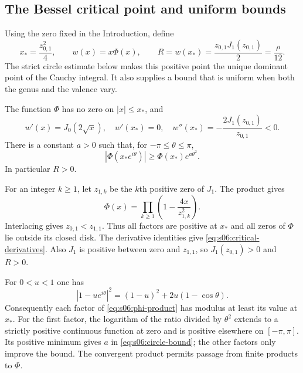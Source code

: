 \subsection{The Bessel critical point and uniform bounds}
\label{subsec:s06:02}

Using the zero fixed in the Introduction, define
\begin{equation}\label{eq:s06:critical-data}
 x_* =\frac{z_{0,1}^2}{4},\qquad
 w(x)=x\Phi(x),\qquad
 R=w(x_*)=\frac{z_{0,1}J_1(z_{0,1})}{2}=\frac{\rho}{12}.
\end{equation}
The strict circle estimate below makes this positive point the
unique dominant point of the Cauchy integral. It also supplies a
bound that is uniform when both the genus and the valence vary.

\begin{lmm}\label{lmm:s06:critical-circle}
The function $\Phi$ has no zero on $|x|\leq x_*$, and
\begin{equation}\label{eq:s06:critical-derivatives}
 w'(x)=J_0(2\sqrt x),\quad w'(x_*)=0,\quad
 w''(x_*)=-\frac{2J_1(z_{0,1})}{z_{0,1}}<0.
\end{equation}
There is a constant $a>0$ such that, for $-\pi\leq\theta\leq\pi$,
\begin{equation}\label{eq:s06:circle-bound}
 |\Phi(x_*e^{i\theta})|
       \geq\Phi(x_*)e^{a\theta^2}.
\end{equation}
In particular $R>0$.
\end{lmm}
\begin{prf}
For an integer $k\geq1$, let $z_{1,k}$ be the $k$th positive zero
of $J_1$. The product \cite[(10.21.15)]{DLMF} gives
\begin{equation}\label{eq:s06:phi-product}
 \Phi(x)=\prod_{k\geq1}\left(1-\frac{4x}{z_{1,k}^2}\right).
\end{equation}
Interlacing \cite[(10.21.2)]{DLMF} gives
$z_{0,1}<z_{1,1}$. Thus all factors are positive at $x_*$ and all
zeros of $\Phi$ lie outside its closed disk.
The derivative identities \cite[(10.6.6), (10.6.3)]{DLMF} give
\eqref{eq:s06:critical-derivatives}. Also $J_1$ is positive between
zero and $z_{1,1}$, so $J_1(z_{0,1})>0$ and $R>0$.

For $0<u<1$ one has
\[
 |1-ue^{i\theta}|^2=(1-u)^2+2u(1-\cos\theta).
\]
Consequently each factor of \eqref{eq:s06:phi-product} has modulus
at least its value at $x_*$. For the first factor, the logarithm
of the ratio divided by $\theta^2$ extends to a strictly positive
continuous function at zero and is positive elsewhere on
$[-\pi,\pi]$. Its positive minimum gives $a$ in
\eqref{eq:s06:circle-bound}; the other factors only improve the
bound. The convergent product permits passage from finite products
to $\Phi$.
\end{prf}

